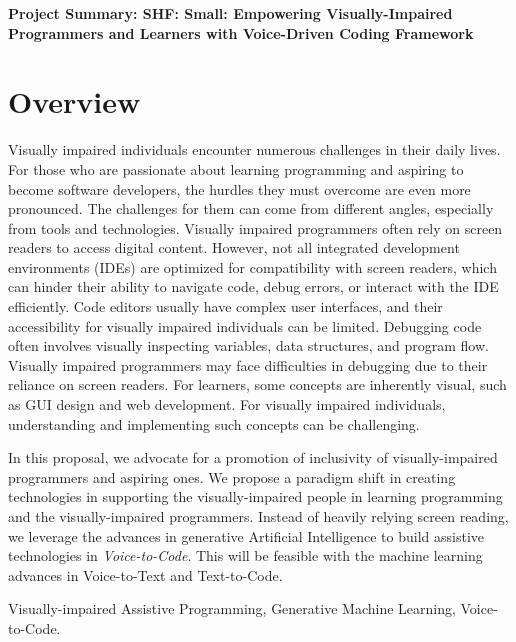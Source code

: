 \documentclass[11pt]{article}
\begin{document}



\begin{center}
  {\bf Project Summary: SHF: Small: Empowering Visually-Impaired
    Programmers and Learners with Voice-Driven Coding Framework}
\end{center}
\vspace{-.1in}



\section{Overview}

Visually impaired individuals encounter numerous challenges in their
daily lives. For those who are passionate about learning programming
and aspiring to become software developers, the hurdles they must
overcome are even more pronounced. The challenges for them can come
from different angles, especially from tools and
technologies. Visually impaired programmers often rely on screen
readers to access digital content. However, not all integrated
development environments (IDEs) are optimized for compatibility with
screen readers, which can hinder their ability to navigate code, debug
errors, or interact with the IDE efficiently. Code editors usually
have complex user interfaces, and their accessibility for visually
impaired individuals can be limited. Debugging code often involves
visually inspecting variables, data structures, and program
flow. Visually impaired programmers may face difficulties in debugging
due to their reliance on screen readers. For learners, some
concepts are inherently visual, such as GUI design and web
development. For visually impaired individuals, understanding and
implementing such concepts can be challenging.

In this proposal, we advocate for a promotion of inclusivity of
visually-impaired programmers and aspiring ones. We propose a paradigm
shift in creating technologies in supporting the visually-impaired
people in learning programming and the visually-impaired
programmers. Instead of heavily relying screen reading, we leverage
the advances in generative Artificial Intelligence to build assistive
technologies in {\em Voice-to-Code}. This will be feasible with the
machine learning advances in Voice-to-Text and Text-to-Code.


 Visually-impaired Assistive Programming, Generative
Machine Learning, Voice-to-Code.
\end{document}
